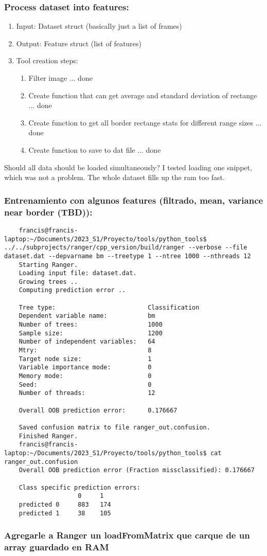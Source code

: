 \documentclass[12pt,oneside]{book}
\begin{document}
  \subsubsection*{Process dataset into features:}
  \begin{enumerate}
    \item Input: Dataset struct (basically just a list of frames)
    \item Output: Feature struct (list of features)
    \item Tool creation steps:
    \begin{enumerate}
      \item Filter image ... done
      \item Create function that can get average and standard deviation of rectange ... done
      \item Create function to get all border rectange stats for different range sizes ... done
      \item Create function to save to dat file ... done
    \end{enumerate}
  \end{enumerate}



  Should all data should be loaded simultaneously?
  I tested loading one snippet, which was not a problem.
  The whole dataset fills up the ram too fast.

  \subsubsection*{Entrenamiento con algunos features (filtrado, mean, variance near border (TBD)):}
  \begin{lstlisting}
    francis@francis-laptop:~/Documents/2023_S1/Proyecto/tools/python_tools$ ../../subprojects/ranger/cpp_version/build/ranger --verbose --file dataset.dat --depvarname bm --treetype 1 --ntree 1000 --nthreads 12
    Starting Ranger.
    Loading input file: dataset.dat.
    Growing trees ..
    Computing prediction error ..
    
    Tree type:                         Classification
    Dependent variable name:           bm
    Number of trees:                   1000
    Sample size:                       1200
    Number of independent variables:   64
    Mtry:                              8
    Target node size:                  1
    Variable importance mode:          0
    Memory mode:                       0
    Seed:                              0
    Number of threads:                 12
    
    Overall OOB prediction error:      0.176667
    
    Saved confusion matrix to file ranger_out.confusion.
    Finished Ranger.
    francis@francis-laptop:~/Documents/2023_S1/Proyecto/tools/python_tools$ cat ranger_out.confusion 
    Overall OOB prediction error (Fraction missclassified): 0.176667
    
    Class specific prediction errors:
                    0     1
    predicted 0     883   174   
    predicted 1     38    105
  \end{lstlisting}

  \subsubsection*{Agregarle a Ranger un loadFromMatrix que carque de un array guardado en RAM}


  \printbibliography[title={Bibliografía},heading=bibintoc]
\end{document}
